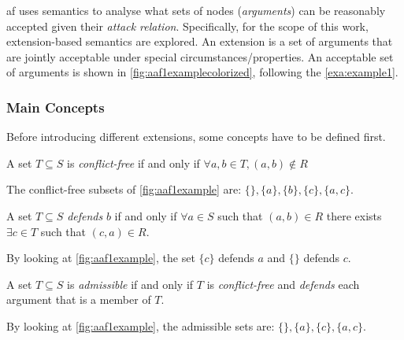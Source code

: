         \gls{af} uses semantics to analyse what sets of nodes (\textit{arguments}) can be reasonably accepted given their \textit{attack relation}. Specifically, for the scope of this work, extension-based semantics are explored. An extension is a set of arguments that are jointly acceptable under special circumstances/properties. An acceptable set of arguments is shown in \autoref{fig:aaf1examplecolorized}, following the \cref{exa:example1}.
        
        
        \subsubsection{Main Concepts}
            Before introducing different extensions, some concepts have to be defined first.
            \begin{definition}
                A set $T \subseteq S$ is \textit{conflict-free} if and only if $ \forall a, b \in T, (a, b) \notin R$
                \label{definition:definition2}
            \end{definition}
            \begin{exa}
                The conflict-free subsets of \autoref{fig:aaf1example} are: $\{\}, \{a\}, \{b\}, \{c\}, \{a, c\}$.
                \label{exa:example2}
            \end{exa}
            
            \begin{definition}
                A set $T \subseteq S$ \textit{defends} $b$ if and only if $ \forall a \in S$ such that $(a, b) \in R$ there exists $\exists c \in T$ such that $(c, a) \in R$.
                \label{definition:definition3}
            \end{definition}
            \begin{exa}
                By looking at \autoref{fig:aaf1example}, the set $\{c\}$ defends $a$ and $\{\}$ defends $c$.
                \label{exa:example3}
            \end{exa}
            
            \begin{definition}
                A set $T \subseteq S$ is \textit{admissible} if and only if $T$ is \textit{conflict-free} and \textit{defends} each argument that is a member of $T$.
                \label{definition:definition4}
            \end{definition}
            \begin{exa}
                By looking at \autoref{fig:aaf1example}, the admissible sets are:  $\{\}, \{a\}, \{c\}, \{a, c\}$.
                \label{exa:example4}
            \end{exa}
            
